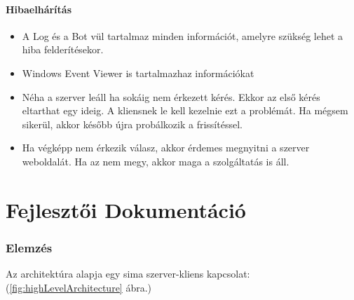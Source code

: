 \documentclass[twoside, a4paper, 12pt]{article}
\begin{document}
\subsection{Hibaelhárítás}
\begin{itemize}
	\item A Log és a Bot vül tartalmaz minden információt, amelyre szükség lehet a hiba felderítésekor.
	\item Windows Event Viewer is tartalmazhaz információkat
	\item Néha a szerver leáll ha sokáig nem érkezett kérés. Ekkor az első kérés eltarthat egy ideig. A kliensnek le kell kezelnie ezt a problémát. Ha mégsem sikerül, akkor később újra probálkozik a frissítéssel.
	\item Ha végképp nem érkezik válasz, akkor érdemes megnyitni a szerver weboldalát. Ha az nem megy, akkor maga a szolgáltatás is áll.
\end{itemize}






































\newpage
\part{Fejlesztői Dokumentáció}
\section{Elemzés}

Az architektúra alapja egy sima szerver-kliens kapcsolat: (\ref{fig:highLevelArchitecture} ábra.)
\end{document}
